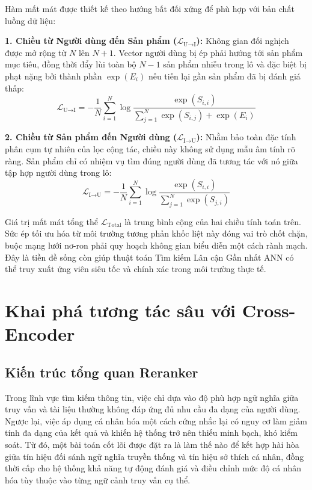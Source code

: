 Hàm mất mát được thiết kế theo hướng bất đối xứng để phù hợp với bản chất luồng dữ liệu:

\textbf{1. Chiều từ Người dùng đến Sản phẩm ($\mathcal{L}_{\text{U} \rightarrow \text{I}}$):} Không gian đối nghịch được mở rộng từ $N$ lên $N+1$. Vector người dùng bị ép phải hướng tới sản phẩm mục tiêu, đồng thời đẩy lùi toàn bộ $N-1$ sản phẩm nhiễu trong lô và đặc biệt bị phạt nặng bởi thành phần $\exp(E_i)$ nếu tiến lại gần sản phẩm đã bị đánh giá thấp:
$$\mathcal{L}_{\text{U} \rightarrow \text{I}} = - \frac{1}{N} \sum_{i=1}^N \log \frac{\exp(S_{i,i})}{\sum_{j=1}^N \exp(S_{i,j}) + \exp(E_i)}$$

\textbf{2. Chiều từ Sản phẩm đến Người dùng ($\mathcal{L}_{\text{I} \rightarrow \text{U}}$):} Nhằm bảo toàn đặc tính phân cụm tự nhiên của lọc cộng tác, chiều này không sử dụng mẫu âm tính rõ ràng. Sản phẩm chỉ có nhiệm vụ tìm đúng người dùng đã tương tác với nó giữa tập hợp người dùng trong lô:
$$\mathcal{L}_{\text{I} \rightarrow \text{U}} = - \frac{1}{N} \sum_{i=1}^N \log \frac{\exp(S_{i,i})}{\sum_{j=1}^N \exp(S_{j,i})}$$

Giá trị mất mát tổng thể $\mathcal{L}_{\text{Total}}$ là trung bình cộng của hai chiều tính toán trên. Sức ép tối ưu hóa từ môi trường tương phản khốc liệt này đóng vai trò chốt chặn, buộc mạng lưới nơ-ron phải quy hoạch không gian biểu diễn một cách rành mạch. Đây là tiền đề sống còn giúp thuật toán Tìm kiếm Lân cận Gần nhất ANN có thể truy xuất ứng viên siêu tốc và chính xác trong môi trường thực tế.

\section{Khai phá tương tác sâu với Cross-Encoder}
\subsection{Kiến trúc tổng quan Reranker}

Trong lĩnh vực tìm kiếm thông tin, việc chỉ dựa vào độ phù hợp ngữ nghĩa giữa truy vấn và tài liệu thường không đáp ứng đủ nhu cầu đa dạng của người dùng. Ngược lại, việc áp dụng cá nhân hóa một cách cứng nhắc lại có nguy cơ làm giảm tính đa dạng của kết quả và khiến hệ thống trở nên thiếu minh bạch, khó kiểm soát. Từ đó, một bài toán cốt lõi được đặt ra là làm thế nào để kết hợp hài hòa giữa tín hiệu đối sánh ngữ nghĩa truyền thống và tín hiệu sở thích cá nhân, đồng thời cấp cho hệ thống khả năng tự động đánh giá và điều chỉnh mức độ cá nhân hóa tùy thuộc vào từng ngữ cảnh truy vấn cụ thể.

